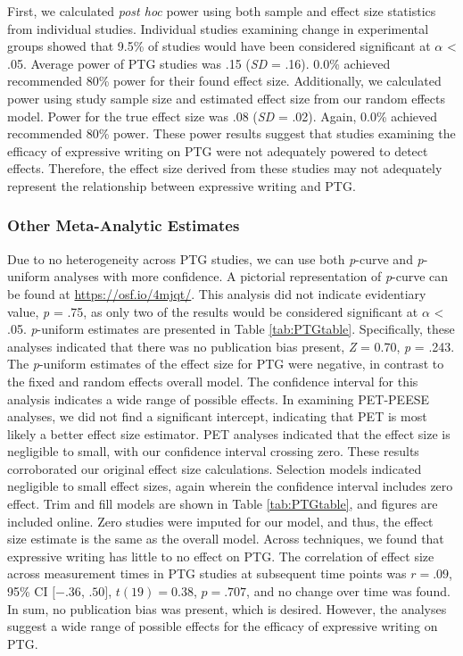 \documentclass[man]{apa6}
\theoremstyle{definition}
\theoremstyle{definition}
\theoremstyle{definition}
\theoremstyle{remark}
\begin{document}
First, we calculated \emph{post hoc} power using both sample and effect
size statistics from individual studies. Individual studies examining
change in experimental groups showed that 9.5\% of studies would have
been considered significant at \(\alpha\) \textless{} .05. Average power
of PTG studies was .15 (\emph{SD} = .16). 0.0\% achieved recommended
80\% power for their found effect size. Additionally, we calculated
power using study sample size and estimated effect size from our random
effects model. Power for the true effect size was .08 (\emph{SD} = .02).
Again, 0.0\% achieved recommended 80\% power. These power results
suggest that studies examining the efficacy of expressive writing on PTG
were not adequately powered to detect effects. Therefore, the effect
size derived from these studies may not adequately represent the
relationship between expressive writing and PTG.

\subsubsection{Other Meta-Analytic
Estimates}\label{other-meta-analytic-estimates-1}

Due to no heterogeneity across PTG studies, we can use both
\emph{p}-curve and \emph{p}-uniform analyses with more confidence. A
pictorial representation of \emph{p}-curve can be found at
\url{https://osf.io/4mjqt/}. This analysis did not indicate evidentiary
value, \emph{p} = .75, as only two of the results would be considered
significant at \(\alpha\) \textless{} .05. \emph{p}-uniform estimates
are presented in Table \ref{tab:PTGtable}. Specifically, these analyses
indicated that there was no publication bias present, \emph{Z} = 0.70,
\emph{p} = .243. The \emph{p}-uniform estimates of the effect size for
PTG were negative, in contrast to the fixed and random effects overall
model. The confidence interval for this analysis indicates a wide range
of possible effects. In examining PET-PEESE analyses, we did not find a
significant intercept, indicating that PET is most likely a better
effect size estimator. PET analyses indicated that the effect size is
negligible to small, with our confidence interval crossing zero. These
results corroborated our original effect size calculations. Selection
models indicated negligible to small effect sizes, again wherein the
confidence interval includes zero effect. Trim and fill models are shown
in Table \ref{tab:PTGtable}, and figures are included online. Zero
studies were imputed for our model, and thus, the effect size estimate
is the same as the overall model. Across techniques, we found that
expressive writing has little to no effect on PTG. The correlation of
effect size across measurement times in PTG studies at subsequent time
points was \(r = .09\), 95\% CI \([-.36\), \(.50]\), \(t(19) = 0.38\),
\(p = .707\), and no change over time was found. In sum, no publication
bias was present, which is desired. However, the analyses suggest a wide
range of possible effects for the efficacy of expressive writing on PTG.
\end{document}
